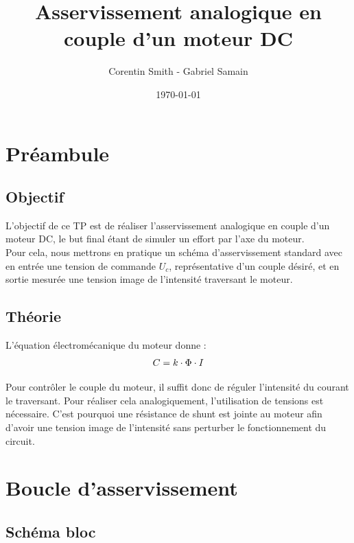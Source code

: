 \documentclass[a4paper]{article}
\title{Asservissement analogique en couple d'un moteur DC}
\author{Corentin Smith - Gabriel Samain}
\date{\today}
\begin{document}
\maketitle

\tableofcontents
\newpage

\section{Préambule}

\subsection{Objectif}

L'objectif de ce TP est de réaliser l'asservissement analogique en couple d'un moteur DC, le but final étant de simuler un effort par l'axe du moteur. \\
Pour cela, nous mettrons en pratique un schéma d'asservissement standard avec en entrée une tension de commande $U_{c}$, représentative d'un couple désiré, et en sortie mesurée une tension image de l'intensité traversant le moteur.

\subsection{Théorie}

L'équation électromécanique du moteur donne :
$$
C = k \cdot \Phi \cdot I \\
$$

Pour contrôler le couple du moteur, il suffit donc de réguler l'intensité du courant le traversant. Pour réaliser cela analogiquement, l'utilisation de tensions est nécessaire. C'est pourquoi une résistance de shunt est jointe au moteur afin d'avoir une tension image de l'intensité sans perturber le fonctionnement du circuit.

\section{Boucle d'asservissement}

\subsection{Schéma bloc}

\hfill \\
\begin{center}
\end{center}
\end{document}
